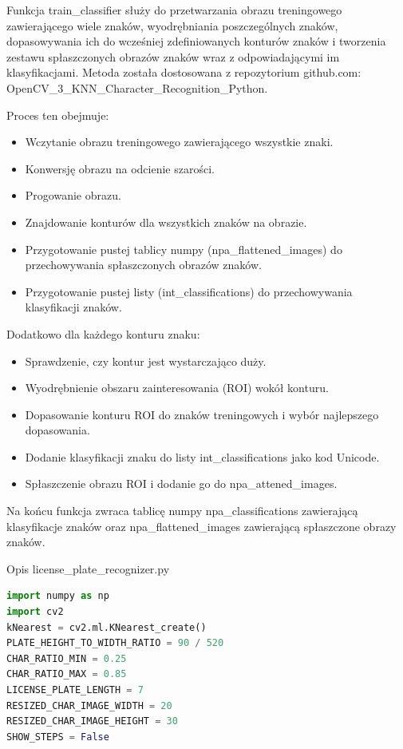 \documentclass[12pt,a4paper,oneside]{article}
\theoremstyle{definition}
\numberwithin{equation}{section}
\begin{document}
   Funkcja train{\_}classifier służy do przetwarzania obrazu treningowego zawierającego wiele znaków, wyodrębniania poszczególnych znaków, dopasowywania ich do wcześniej zdefiniowanych konturów znaków i tworzenia zestawu spłaszczonych obrazów znaków wraz z odpowiadającymi im klasyfikacjami. Metoda została dostosowana z repozytorium github.com: OpenCV{\_}3{\_}KNN{\_}Character{\_}Recognition{\_}Python.



Proces ten obejmuje:
\begin{itemize}
  \item Wczytanie obrazu treningowego zawierającego wszystkie znaki.
  \item Konwersję obrazu na odcienie szarości.
  \item Progowanie obrazu.
  \item Znajdowanie konturów dla wszystkich znaków na obrazie.
  \item Przygotowanie pustej tablicy numpy (npa{\_}flattened{\_}images) do przechowywania spłaszczonych obrazów znaków.
  \item  Przygotowanie pustej listy (int{\_}classifications) do przechowywania klasyfikacji znaków.
\end{itemize}
    

Dodatkowo dla każdego konturu znaku:
\begin{itemize}
  \item Sprawdzenie, czy kontur jest wystarczająco duży.
  \item Wyodrębnienie obszaru zainteresowania (ROI) wokół konturu.
  \item Dopasowanie konturu ROI do znaków treningowych i wybór najlepszego dopasowania.
  \item Dodanie klasyfikacji znaku do listy int{\_}classifications jako kod Unicode.
  \item Spłaszczenie obrazu ROI i dodanie go do npa{\_}attened{\_}images.

\end{itemize}

Na końcu funkcja zwraca tablicę numpy npa{\_}classifications zawierającą klasyfikacje znaków oraz npa{\_}flattened{\_}images zawierającą spłaszczone obrazy znaków.    
    
Opis license{\_}plate{\_}recognizer.py





\begin{lstlisting}[language=Python]
import numpy as np
import cv2
kNearest = cv2.ml.KNearest_create()
PLATE_HEIGHT_TO_WIDTH_RATIO = 90 / 520
CHAR_RATIO_MIN = 0.25
CHAR_RATIO_MAX = 0.85
LICENSE_PLATE_LENGTH = 7
RESIZED_CHAR_IMAGE_WIDTH = 20
RESIZED_CHAR_IMAGE_HEIGHT = 30
SHOW_STEPS = False

\end{lstlisting} 
\end{document}
